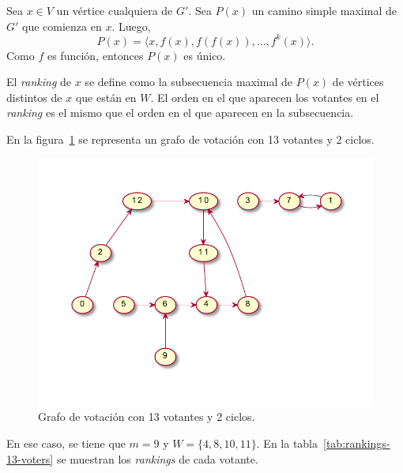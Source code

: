 Sea $x \in V$ un v\'ertice cualquiera de $G'$. Sea $P(x)$ un camino simple maximal de $G'$ que comienza en $x$. Luego,
$$
P(x) = \langle x, f(x), f(f(x)), \ldots, f^{k}(x) \rangle.
$$
Como $f$ es funci\'on, entonces $P(x)$ es \'unico. 

\begin{definition}\label{def:ranking}
    El \textit{ranking} de $x$ se define como  la subsecuencia maximal de $P(x)$ de v\'ertices distintos de $x$ que est\'an en $W$. El orden en el que aparecen los votantes en el \textit{ranking} es el mismo que el orden en el que aparecen en la subsecuencia.
\end{definition}

En la figura~\ref{fig:graph-13-voters-2-cycles} se representa un grafo de votaci\'on con 13 votantes y 2 ciclos.

\begin{figure}[h!]
    \centering
    \includegraphics[scale=.9]{Graphics/graph-13-voters-2-cycles-largest-has-4.pdf}
    \caption{Grafo de votaci\'on con 13 votantes y 2 ciclos.}
    \label{fig:graph-13-voters-2-cycles}
\end{figure}

En ese caso, se tiene que $m = 9$ y $W = \{ 4, 8, 10, 11 \}$. En la tabla~\ref{tab:rankings-13-voters} se muestran los \textit{rankings} de cada votante.

